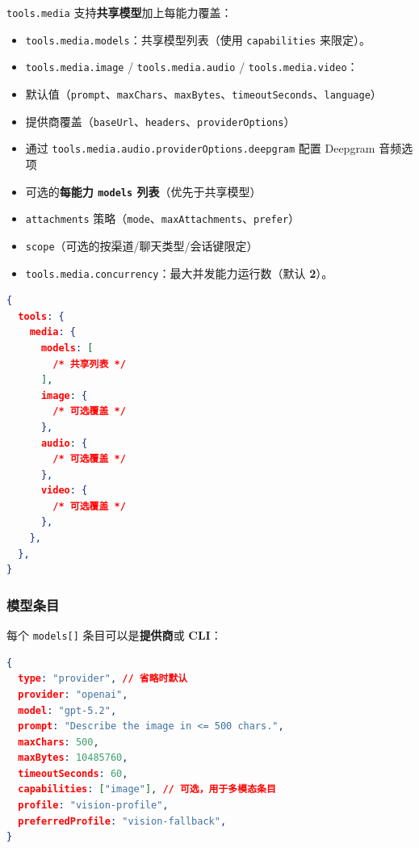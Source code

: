\texttt{tools.media} 支持\textbf{共享模型}加上每能力覆盖：

\begin{itemize}
  \item \texttt{tools.media.models}：共享模型列表（使用 \texttt{capabilities} 来限定）。
  \item \texttt{tools.media.image} / \texttt{tools.media.audio} / \texttt{tools.media.video}：
  \item 默认值（\texttt{prompt}、\texttt{maxChars}、\texttt{maxBytes}、\texttt{timeoutSeconds}、\texttt{language}）
  \item 提供商覆盖（\texttt{baseUrl}、\texttt{headers}、\texttt{providerOptions}）
  \item 通过 \texttt{tools.media.audio.providerOptions.deepgram} 配置 Deepgram 音频选项
  \item 可选的\textbf{每能力 \texttt{models} 列表}（优先于共享模型）
  \item \texttt{attachments} 策略（\texttt{mode}、\texttt{maxAttachments}、\texttt{prefer}）
  \item \texttt{scope}（可选的按渠道/聊天类型/会话键限定）
  \item \texttt{tools.media.concurrency}：最大并发能力运行数（默认 \textbf{2}）。
\end{itemize}


\begin{lstlisting}[language=json]
{
  tools: {
    media: {
      models: [
        /* 共享列表 */
      ],
      image: {
        /* 可选覆盖 */
      },
      audio: {
        /* 可选覆盖 */
      },
      video: {
        /* 可选覆盖 */
      },
    },
  },
}
\end{lstlisting}


\subsubsection{模型条目}


每个 \texttt{models[]} 条目可以是\textbf{提供商}或 \textbf{CLI}：

\begin{lstlisting}[language=json]
{
  type: "provider", // 省略时默认
  provider: "openai",
  model: "gpt-5.2",
  prompt: "Describe the image in <= 500 chars.",
  maxChars: 500,
  maxBytes: 10485760,
  timeoutSeconds: 60,
  capabilities: ["image"], // 可选，用于多模态条目
  profile: "vision-profile",
  preferredProfile: "vision-fallback",
}
\end{lstlisting}


